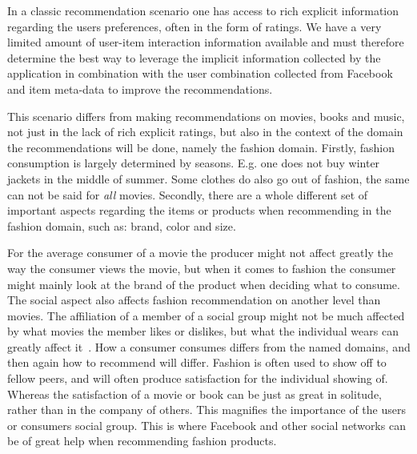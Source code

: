 In a classic recommendation scenario one has access to rich explicit
information regarding the users preferences, often in the form of ratings. We
have a very limited amount of user-item interaction information available and
must therefore determine the best way to leverage the implicit information
collected by the application in combination with the user combination collected
from Facebook and item meta-data to improve the recommendations.

This scenario differs from making recommendations on movies, books and music, not just in the lack of rich explicit ratings, but also in the context of the domain the recommendations will be done, namely the fashion domain.
Firstly, fashion consumption is largely determined by seasons.
E.g. one does not buy winter jackets in the middle of summer.  Some clothes do
also go out of fashion, the same can not be said for \emph{all} movies. Secondly, there are a whole different set of important aspects regarding the items or products
when recommending in the fashion domain, such as: brand, color and size.

For the average consumer of a movie the producer might not affect greatly the
way the consumer views the movie, but when it comes to fashion the consumer
might mainly look at the brand of the product when deciding what to consume.
The social aspect also affects fashion recommendation on another level than
movies.
The affiliation of a member of a social group might not be much affected by
what movies the member likes or dislikes, but what the individual wears can
greatly affect it~\cite{vignali2009fashion}.
How a consumer consumes differs from the named domains, and then again how to
recommend will differ.  Fashion is often used to show off to fellow peers, and
will often produce satisfaction for the individual showing of.
Whereas the satisfaction of a movie or book can be just as great in solitude,
rather than in the company of others.  This magnifies the importance of the
users or consumers social group.  This is where Facebook and other social
networks can be of great help when recommending fashion products.


